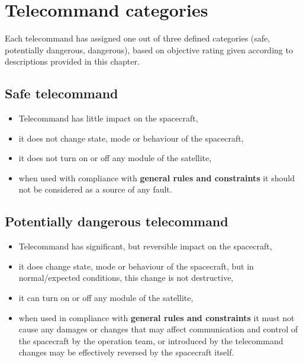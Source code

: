 \section{Telecommand categories}
\label{sec:tc_categories}

Each telecommand has assigned one out of three defined categories (safe, potentially dangerous, dangerous), based on objective rating given according to descriptions provided in this chapter.

\subsection{Safe telecommand}
\vspace{1em}
\begin{itemize}
    \item Telecommand has little impact on the spacecraft,
    \item it does not change state, mode or behaviour of the spacecraft,
    \item it does not turn on or off any module of the satellite,
    \item when used with compliance with \textbf{general rules and constraints} it should not be considered as a source of any fault.
\end{itemize}

\subsection{Potentially dangerous telecommand}
\vspace{1em}
\begin{itemize}
    \item Telecommand has significant, but reversible impact on the spacecraft,
    \item it does change state, mode or behaviour of the spacecraft, but in normal/expected conditions, this change is not destructive,
    \item it can turn on or off any module of the satellite,
    \item when used in compliance with \textbf{general rules and constraints} it must not cause any damages or changes that may affect communication and control of the spacecraft by the operation team, or introduced by the telecommand changes may be effectively reversed by the spacecraft itself.
\end{itemize}


